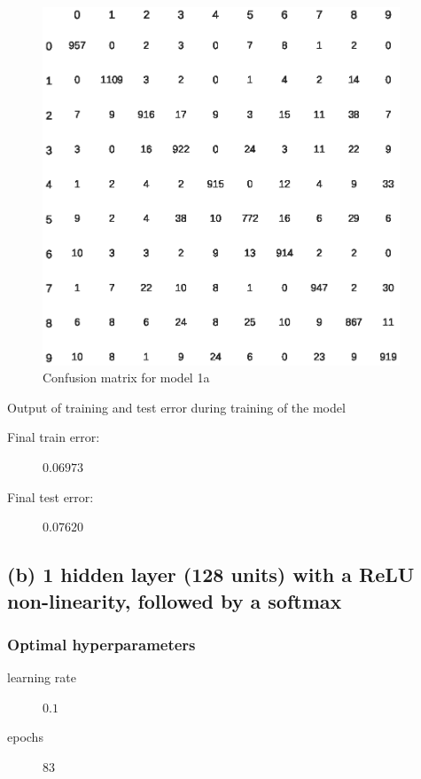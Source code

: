 \documentclass{article}
\begin{document}
\begin{figure}[H]
  \centering
  \includegraphics[width=0.95\textwidth]{confusion_matrix_1a.eps}
  \caption{Confusion matrix for model 1a}
  \label{fig:conf_1a}
\end{figure}

Output of training and test error during training of the model



\begin{description}
\item[Final train error:] $0.06973$
\item[Final test error:] $0.07620$
\end{description}

\newpage

\subsection{(b) 1 hidden layer (128 units) with a ReLU non-linearity, followed
  by a softmax}

\subsubsection{Optimal hyperparameters}

\begin{description}
\item[learning rate] $0.1$
\item[epochs] $83$
\end{description}
\end{document}
